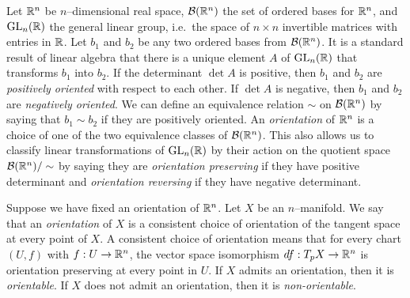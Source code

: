 \begin{defn}[Orientation]
	\label{def:orientation}
	Let $\mathbb{R}^n$ be $n$--dimensional real space, $\mathcal{B}(\mathbb{R}^n)$ the set of ordered bases for $\mathbb{R}^n$, and $\textrm{GL}_{n}(\mathbb{R})$ the general linear group, i.e.\ the space of $n\times n$ invertible matrices with entries in $\mathbb{R}$.
	Let $b_1$ and $b_2$ be any two ordered bases from $\mathcal{B}(\mathbb{R}^n)$.
	It is a standard result of linear algebra that there is a unique element $A$ of $\textrm{GL}_{n}(\mathbb{R})$ that transforms $b_1$ into $b_2$.
	If the determinant $\det A$ is positive, then $b_1$ and $b_2$ are \emph{positively oriented} with respect to each other.
	If $\det A$ is negative, then $b_1$ and $b_2$ are \emph{negatively oriented}.
	We can define an equivalence relation $\sim$ on $\mathcal{B}(\mathbb{R}^n)$ by saying that $b_1\sim b_2$ if they are positively oriented.
	An \emph{orientation} of $\mathbb{R}^n$ is a choice of one of the two equivalence classes of $\mathcal{B}(\mathbb{R}^n)$.
	This also allows us to classify linear transformations of $\textrm{GL}_{n}(\mathbb{R})$ by their action on the quotient space $\mathcal{B}(\mathbb{R}^n)/\sim$ by saying they are \emph{orientation preserving} if they have positive determinant and \emph{orientation reversing} if they have negative determinant.
	
	Suppose we have fixed an orientation of $\mathbb{R}^n$.
	Let $X$ be an $n$--manifold.
	We say that an \emph{orientation} of $X$ is a consistent choice of orientation of the tangent space at every point of $X$.
	A consistent choice of orientation means that for every chart $(U,f)$ with $f:U\to\mathbb{R}^n$, the vector space isomorphism $df:T_p X\to \mathbb{R}^n$ is orientation preserving at every point in $U$. 
	If $X$ admits an orientation, then it is \emph{orientable}.
	If $X$ does not admit an orientation, then it is \emph{non-orientable}.
\end{defn}